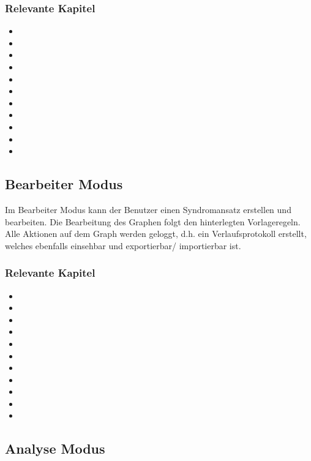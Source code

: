 \documentclass[enabledeprecatedfontcommands,fontsize=11pt,paper=a4,twoside]{scrartcl}
\newcounter{one}
\begin{document}
\subsubsection{Relevante Kapitel}
\begin{itemize}
	\item {}
	\item {}	
	\item {}
	\item {}
	\item {}
	\item {}
	\item {}
	\item {}
	\item {}
	\item {}
	\item {}	
\end{itemize}
\subsection{Bearbeiter Modus} \label{sec:editor}
Im Bearbeiter Modus kann der Benutzer einen Syndromansatz erstellen und bearbeiten. Die Bearbeitung des Graphen folgt den hinterlegten Vorlageregeln. Alle Aktionen auf dem Graph werden geloggt, d.h. ein Verlaufsprotokoll erstellt, welches ebenfalls einsehbar und exportierbar/ importierbar ist. 
\subsubsection{Relevante Kapitel}
\begin{itemize}
	\item {}
	\item {}	
	\item {}
	\item {}
	\item {}
	\item {}
	\item {}
	\item {}
	\item {}
	\item {}
	\item {}	
\end{itemize}
\subsection{Analyse Modus}
\end{document}
